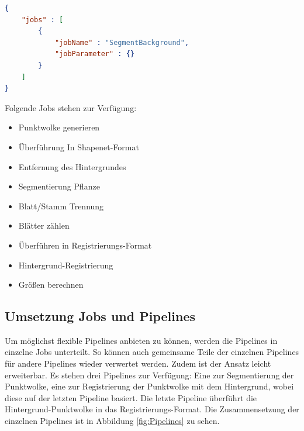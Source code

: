 \documentclass[12pt,titlepage, twoside]{article}
\begin{document}
\begin{lstlisting}[language=json, caption={Beispiel Payload zum starten einer Pipeline}, captionpos=b, label=listing:example:payload]
{
    "jobs" : [
        {
            "jobName" : "SegmentBackground",
            "jobParameter" : {}
        }
    ]
}
\end{lstlisting}

Folgende Jobs stehen zur Verfügung:

\begin{itemize}
\item Punktwolke generieren
\item Überführung In Shapenet-Format 
\item Entfernung des Hintergrundes
\item Segmentierung Pflanze
\item Blatt/Stamm Trennung
\item Blätter zählen
\item Überführen in Registrierungs-Format 
\item Hintergrund-Registrierung
\item Größen berechnen
\end{itemize}


\subsection{Umsetzung Jobs und Pipelines}
\label{sec:realisierung:implementierung5}

Um möglichst flexible Pipelines anbieten zu können, werden die Pipelines in einzelne Jobs unterteilt. So können auch gemeinsame Teile der einzelnen Pipelines für andere Pipelines wieder verwertet werden.
Zudem ist der Ansatz leicht erweiterbar. 
Es stehen drei Pipelines zur Verfügung: Eine zur Segmentierung der Punktwolke, eine zur Registrierung der Punktwolke mit dem Hintergrund, wobei diese auf der letzten Pipeline basiert.
Die letzte Pipeline überführt die Hintergrund-Punktwolke in das Registrierungs-Format.
Die Zusammensetzung der einzelnen Pipelines ist in Abbildung \ref{fig:Pipelines} zu sehen.
\end{document}
